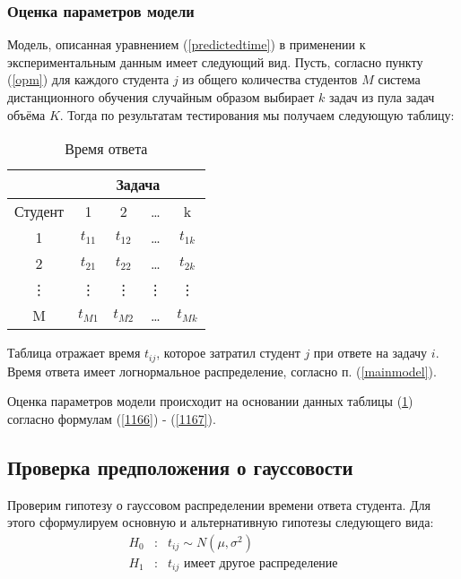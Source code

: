 \subsubsection{Оценка параметров модели}

Модель, описанная уравнением (\ref{predictedtime}) в применении к экспериментальным данным имеет следующий вид. Пусть, согласно пункту (\ref{opm}) для каждого студента $j$ из общего количества студентов $M$ система дистанционного обучения случайным образом выбирает $k$ задач из пула задач объёма $K$. Тогда по результатам тестирования мы получаем следующую таблицу:
\begin{table}[H]
\caption{Время ответа}
\label{tabular:IRTtable}
\begin{center}
\begin{tabular}{|c|c|c|c|c|}
\hline
 & \multicolumn{4}{|c|}{Задача}\\
 \hline
 Студент & 1 & 2 & \dots & k \\
 \hline
 1 & $t_{11}$ & $t_{12}$ & \dots & $t_{1k}$\\
\hline
 2 & $t_{21}$ & $t_{22}$ & \dots & $t_{2k}$\\
\hline
 \vdots & \vdots & \vdots & \vdots & \vdots\\
\hline
 M & $t_{M1}$ & $t_{M2}$ & \dots & $t_{Mk}$\\
\hline
\end{tabular}
\end{center}
\end{table}

Таблица отражает время $t_{ij}$, которое затратил студент  $j$ при ответе на задачу $i$. Время ответа имеет логнормальное распределение, согласно п. (\ref{mainmodel}).

Оценка параметров модели происходит на основании данных таблицы (\ref{tabular:IRTtable}) согласно формулам (\ref{1166}) - (\ref{1167}).

\subsection{Проверка предположения о гауссовости}

Проверим гипотезу о гауссовом распределении времени ответа студента. Для этого сформулируем основную и альтернативную гипотезы следующего вида:
$$
\begin{array}{lll}
H_0 &:& t_{ij} \sim N\left(\mu,\sigma^2\right)\\
H_1 &:& t_{ij} \mbox{ имеет другое распределение}
\end{array}
$$

